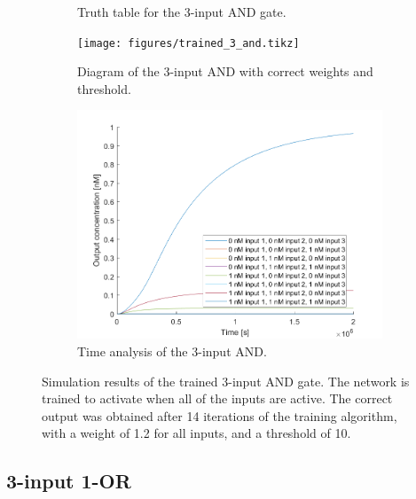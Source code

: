 \begin{figure}[H]
\begin{subfigure}[t]{.49\columnwidth}
\begin{adjustbox}{width=\textwidth}
\begin{tabular}[b]{cccc}
    \hline
    \end{tabular}
  \end{adjustbox}
    \caption{Truth table for the 3-input AND gate.}
\end{subfigure}
\begin{subfigure}[t]{.49\textwidth}
  \texttt{[image: figures/trained\_3\_and.tikz]}
  \caption{Diagram of the 3-input AND with correct weights and threshold.}
\end{subfigure}
\hfill
\begin{subfigure}[t]{\textwidth}
  \centering
\includegraphics[width=\textwidth]{images/and_simulation_3input.png}
\caption{Time analysis of the 3-input AND.}
\end{subfigure}
\caption{Simulation results of the trained 3-input AND gate. The network is trained to activate when all of the inputs are active. The correct output was obtained after 14 iterations of the training algorithm, with a weight of 1.2 for all inputs, and a threshold of 10.}
\label{3_and}
\end{figure}

\subsection{3-input 1-OR}

